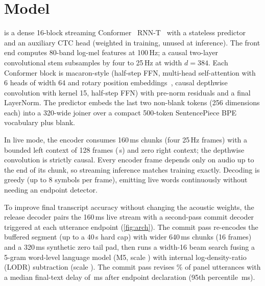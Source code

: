 \section{Model}\label{sec:model}

 \ultra{} \ReleaseVer{} is a dense 16-block streaming
Conformer~\cite{gulati2020conformer} RNN-T~\cite{graves2012rnnt} with a stateless
predictor~\cite{ghodsi2020stateless} and an auxiliary CTC head (weighted \CtcWeight{} in training,
unused at inference). The front end computes 80-band log-mel features at 100\,Hz; a causal
two-layer convolutional stem subsamples by four to 25\,Hz at width $d=384$. Each Conformer block is
macaron-style (half-step FFN, multi-head self-attention with 6 heads of width 64 and rotary
position embeddings~\cite{su2021roformer}, causal depthwise convolution with kernel 15, half-step
FFN) with pre-norm residuals and a final LayerNorm. The predictor embeds the last two non-blank
tokens (256 dimensions each) into a 320-wide joiner over a compact 500-token SentencePiece BPE
vocabulary plus blank.

 In live mode, the encoder consumes 160\,ms chunks
(four 25\,Hz frames) with a bounded left context of 128 frames (\LeftCtxSec\,s) and zero right
context; the depthwise convolution is strictly causal. Every encoder frame depends only on audio up
to the end of its chunk, so streaming inference matches training exactly. Decoding is greedy (up to
8 symbols per frame), emitting live words continuously without needing an endpoint detector.

 To improve final transcript accuracy
without changing the acoustic weights, the release decoder pairs the 160\,ms live stream with a
second-pass commit decoder triggered at each utterance endpoint (\cref{fig:arch}). The commit pass
re-encodes the buffered segment (up to a 40\,s hard cap) with wider 640\,ms chunks (16 frames) and
a 320\,ms synthetic zero tail pad, then runs a width-16 beam search fusing a 5-gram word-level
language model (M5, scale \LmScale) with internal log-density-ratio (LODR) subtraction (scale
\LodrScale). The commit pass revises \RelCommitRevisedPct\% of panel utterances with a median
final-text delay of \RelCommitDelayPfifty\,ms after endpoint declaration
(95th percentile \RelCommitDelayPninetyFive\,ms).


